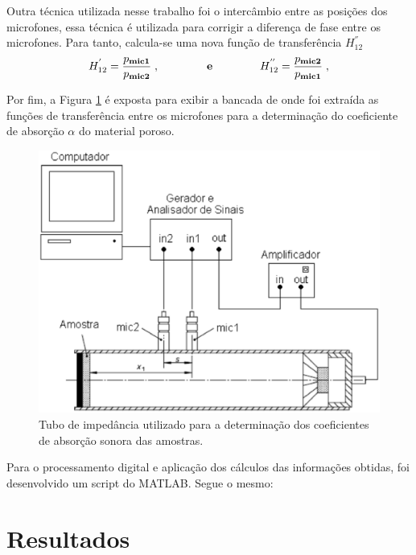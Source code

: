 Outra técnica utilizada nesse trabalho foi o intercâmbio entre as posições dos microfones, essa técnica é utilizada para corrigir a diferença de fase entre os microfones. Para tanto, calcula-se uma nova função de transferência $H_{12}^{''}$
\begin{equation}
	H_{12}^{'} = \frac{p_\textbf{mic1}}{p_\textbf{mic2}}\;,
\hspace{1.5 cm} \textbf{e} \hspace{1.5 cm} H_{12}^{''} = \frac{p_\textbf{mic2}}{p_\textbf{mic1}}\;,  	
\end{equation}

Por fim, a Figura \ref{fig.experimento} é exposta para exibir a bancada de onde foi extraída as funções de transferência entre os microfones para a determinação do coeficiente de absorção $\alpha$ do material poroso.

\begin{figure}[h]
\centering
\includegraphics[scale=0.4]{figs/bancada.eps}
\caption{Tubo de impedância utilizado para a determinação dos coeficientes de absorção sonora das amostras.}
\label{fig.experimento}
\end{figure}

Para o processamento digital e aplicação dos cálculos das informações obtidas, foi desenvolvido um script do MATLAB. Segue o mesmo:


\chapter{Resultados}\label{resultados}

